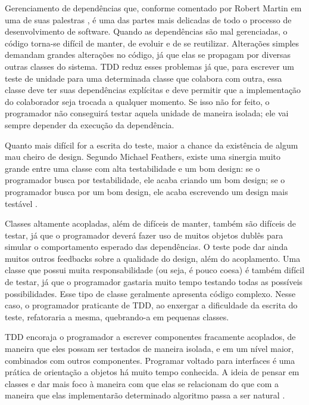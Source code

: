 Gerenciamento de dependências que, conforme comentado por Robert Martin em uma
de suas palestras \cite{bobmartin-infoq}, é uma das partes mais delicadas de
todo o processo de desenvolvimento de software. Quando as dependências são mal
gerenciadas, o código torna-se difícil de manter, de evoluir e de se reutilizar.
Alterações simples demandam grandes alterações no código, já que elas se
propagam por diversas outras classes do sistema.
TDD reduz esses problemas já que, para escrever um teste de unidade para uma
determinada classe que colabora com outra, essa classe deve ter suas
dependências explícitas e deve permitir que a implementação do colaborador seja
trocada a qualquer momento. Se isso não for feito, o programador não conseguirá
testar aquela unidade de maneira isolada; ele vai sempre depender da execução da
dependência.

Quanto mais difícil for a escrita do teste, maior a chance da existência de
algum mau cheiro de design. Segundo Michael Feathers, existe uma sinergia muito
grande entre uma classe com alta testabilidade e um bom design: se o
programador busca por testabilidade, ele acaba criando um bom design; se o
programador busca por um bom design, ele acaba escrevendo um design mais
testável \cite{feathers-synergy}.

Classes altamente acopladas, além de difíceis de manter, também são difíceis de
testar, já que o programador deverá fazer uso de muitos objetos dublês para
simular o comportamento esperado das dependências.
O teste pode dar ainda muitos outros feedbacks sobre a qualidade do design,
além do acoplamento. Uma classe que possui muita responsabilidade (ou seja, é
pouco coesa) é também difícil de testar, já que o programador gastaria muito
tempo testando todas as possíveis possibilidades. Esse tipo de classe geralmente
apresenta código complexo. Nesse caso, o programador praticante de TDD, ao
enxergar a dificuldade da escrita do teste, refatoraria a mesma, quebrando-a em
pequenas classes.

TDD encoraja o programador a escrever componentes fracamente acoplados, de
maneira que eles possam ser testados de maneira isolada, e em um nível maior,
combinados com outros componentes.
Programar voltado para interfaces é uma prática de orientação a objetos há muito
tempo conhecida. A ideia de pensar em classes e dar mais foco à maneira com que
elas se relacionam do que com a maneira que elas implementarão determinado
algoritmo passa a ser natural \cite{GOOS}. 

